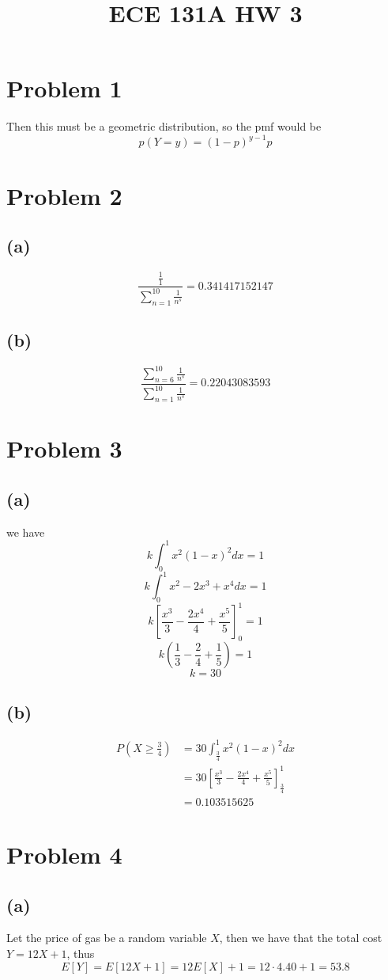 
\title{ECE 131A HW 3}

\maketitle
\section*{Problem 1}
Then this must be a geometric distribution, so the pmf would be 
$$p(Y=y)=(1-p)^{y-1}p$$
\section*{Problem 2}
\subsection*{(a)}
$$\frac{\frac{1}{1}}{\sum_{n=1}^{10}\frac{1}{n^s}}=\boxed{0.341417152147}$$
\subsection*{(b)}
$$\frac{\sum_{n=6}^{10}\frac{1}{n^s}}{\sum_{n=1}^{10}\frac{1}{n^s}}=\boxed{0.22043083593}$$
\section*{Problem 3}
\subsection*{(a)}
we have
$$k\int_{0}^{1}x^2(1-x)^2dx=1$$
$$k\int_{0}^{1}x^2-2x^3+x^4dx=1$$
$$k\left[\frac{x^3}{3}-\frac{2x^4}{4}+\frac{x^5}{5}\right]_{0}^{1}=1$$
$$k\left(\frac{1}{3}-\frac{2}{4}+\frac{1}{5}\right)=1$$
$$\boxed{k=30}$$
\subsection*{(b)}
\begin{align*}
    P(X\geq \frac{3}{4})&=30\int_{\frac{3}{4}}^{1}x^2(1-x)^2dx\\
    &=30\left[\frac{x^3}{3}-\frac{2x^4}{4}+\frac{x^5}{5}\right]_{\frac{3}{4}}^{1}\\
    &=\boxed{0.103515625}
\end{align*}
\section*{Problem 4}
\subsection*{(a)}
Let the price of gas be a random variable $X$, then we have that the
total cost $Y=12X+1$, thus
$$E[Y]=E[12X+1]=12E[X]+1=12\cdot4.40+1=\boxed{53.8}$$

